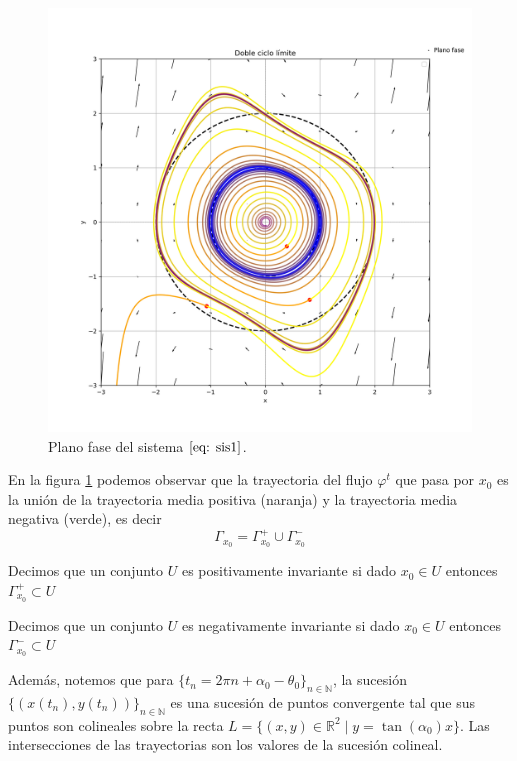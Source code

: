\begin{figure}[h]\label{fig: plano_fase}
	\centering
	\includegraphics[width=12.5cm]{plano_fase.png}
	\caption{Plano fase del sistema $\eqref{eq: sis1}$.}
\end{figure}

En la figura \ref{fig: plano_fase} podemos observar que la trayectoria del flujo $\varphi^t$ que pasa por $x_0$ es la unión de la trayectoria media positiva (naranja) y la trayectoria media negativa (verde), es decir
$$\varGamma_{x_0}=\varGamma_{x_0}^{+}\cup\varGamma_{x_0}^{-}$$

\begin{definition}
	Decimos que un conjunto $U$ es positivamente invariante si dado $x_0\in U$ entonces  $\varGamma_{x_0}^{+}\subset U$
\end{definition}

\begin{definition}
	Decimos que un conjunto $U$ es negativamente invariante si dado $x_0\in U$ entonces  $\varGamma_{x_0}^{-}\subset U$
\end{definition}

Además, notemos que para $\{t_n=2\pi n+\alpha_0-\theta_0\}_{n\in \mathbb{N}}$,
la sucesión $\{(x(t_n),y(t_n))\}_{n\in\mathbb{N}}$ es una sucesión
de puntos convergente tal que sus puntos son colineales sobre la recta
$L=\{(x,y)\in\mathbb{R}^2\mid y=\tan(\alpha_0)x \}$. Las intersecciones de las trayectorias
son los valores de la sucesión colineal.\\

